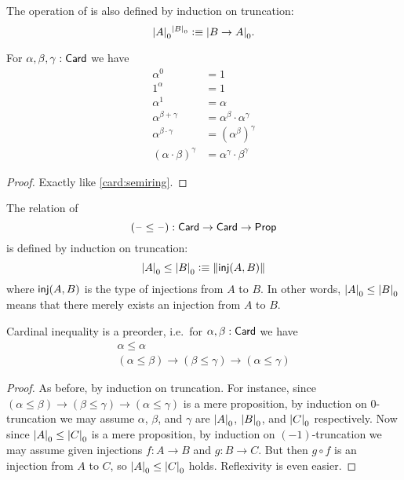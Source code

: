 \begin{defn}
  The operation of  is also defined by induction on truncation:
  \[ \mathopen{}\left|A\right|_{0}^{}\mathclose{}^{\mathopen{}\left|B\right|_{0}^{}\mathclose{}} \vcentcolon\equiv \mathopen{}\left|B\to A\right|_{0}^{}\mathclose{}. \]
\end{defn}

\begin{lem}\label{card:exp}
  For $\alpha,\beta,\gamma:\mathsf{Card}$ we have
  \begin{align*}
    \alpha^0 &= 1\\
    1^\alpha &= 1\\
    \alpha^1 &= \alpha\\
    \alpha^{\beta+\gamma} &= \alpha^\beta \cdot \alpha^\gamma\\
    \alpha^{\beta\cdot \gamma} &= (\alpha^{\beta})^\gamma\\
    (\alpha\cdot\beta)^\gamma &= \alpha^\gamma \cdot \beta^\gamma
  \end{align*}
\end{lem}
\begin{proof}
  Exactly like \autoref{card:semiring}.
\end{proof}

\begin{defn}
  The relation of 
  \[ (\mathord{\hspace{1pt}\text{--}\hspace{1pt}}\le\mathord{\hspace{1pt}\text{--}\hspace{1pt}}) : \mathsf{Card}\to\mathsf{Card}\to\mathsf{Prop} \]
  is defined by induction on truncation:
  \[ \mathopen{}\left|A\right|_{0}^{}\mathclose{} \le \mathopen{}\left|B\right|_{0}^{}\mathclose{} \vcentcolon\equiv \mathopen{}\left\Vert \mathsf{inj}(A,B)\right\Vert_{}\mathclose{} \]
  where $\mathsf{inj}(A,B)$ is the type of injections from $A$ to $B$.
  In other words, $\mathopen{}\left|A\right|_{0}^{}\mathclose{} \le \mathopen{}\left|B\right|_{0}^{}\mathclose{}$ means that there merely exists an injection from $A$ to $B$.
\end{defn}

\begin{lem}
  Cardinal inequality is a preorder, i.e.\ for $\alpha,\beta:\mathsf{Card}$ we have
  \begin{gather*}
    \alpha \le \alpha\\
    (\alpha \le \beta) \to (\beta\le\gamma) \to (\alpha\le\gamma)
  \end{gather*}
\end{lem}
\begin{proof}
  As before, by induction on truncation.
  For instance, since $(\alpha \le \beta) \to (\beta\le\gamma) \to (\alpha\le\gamma)$ is a mere proposition, by induction on 0-truncation we may assume $\alpha$, $\beta$, and $\gamma$ are $\mathopen{}\left|A\right|_{0}^{}\mathclose{}$, $\mathopen{}\left|B\right|_{0}^{}\mathclose{}$, and $\mathopen{}\left|C\right|_{0}^{}\mathclose{}$ respectively.
  Now since $\mathopen{}\left|A\right|_{0}^{}\mathclose{} \le \mathopen{}\left|C\right|_{0}^{}\mathclose{}$ is a mere proposition, by induction on $(-1)$-truncation we may assume given injections $f:A\to B$ and $g:B\to C$.
  But then $g\circ f$ is an injection from $A$ to $C$, so $\mathopen{}\left|A\right|_{0}^{}\mathclose{} \le \mathopen{}\left|C\right|_{0}^{}\mathclose{}$ holds.
  Reflexivity is even easier.
\end{proof}

